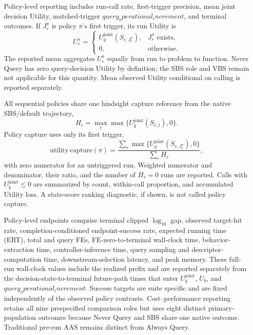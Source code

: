 Policy-level reporting includes run-call rate, first-trigger precision, mean
joint decision Utility, matched-trigger $query_operational_increment$, and terminal outcomes.  If
$J_r^\pi$ is policy $\pi$'s first trigger, its run Utility is
\begin{equation}
  U_r^\pi=
  \begin{cases}
    U_q^{\mathrm{joint}}(S_{r,J_r^\pi}), & J_r^\pi\text{ exists},\\
    0, & \text{otherwise}.
  \end{cases}
  \label{eq:policy-decision-utility}
\end{equation}
The reported mean aggregates $U_r^\pi$ equally from run to problem to function.
Never Query has zero query-decision Utility by definition; the SBS role and VBS
remain not applicable for this quantity.  Mean observed Utility conditional on
calling is reported separately.

All sequential policies share one hindsight capture reference from the native
SBS/default trajectory,
\begin{equation}
  H_r=\max_t\max\{U_q^{\mathrm{joint}}(S_{r,t}),0\}.
\end{equation}
Policy capture uses only its first trigger,
\begin{equation}
  \mathrm{utility\ capture}(\pi)=
  \frac{\sum_r\max\{U_q^{\mathrm{joint}}(S_{r,J_r^\pi}),0\}}
       {\sum_r H_r},
  \label{eq:utility-capture}
\end{equation}
with zero numerator for an untriggered run.  Weighted numerator and denominator,
their ratio, and the number of $H_r=0$ runs are reported.  Calls with
$U_q^{\mathrm{joint}}\le0$ are summarized by count, within-call proportion, and
accumulated Utility loss.  A state-score ranking diagnostic, if shown, is not
called policy capture.

Policy-level endpoints comprise terminal clipped $\log_{10}$ gap,
observed target-hit rate, completion-conditioned endpoint-success rate,
expected running time (ERT), total and query FEs,
FE-zero-to-terminal wall-clock time, behavior-extraction time,
controller-inference time, query
sampling and descriptor-computation time, downstream-selection latency, and
peak memory.  These full-run wall-clock values include the realized prefix and
are reported separately from the decision-state-to-terminal future-path times
that enter $U_q^{\mathrm{joint}}$, $U_b$, and $query_operational_increment$.  Success targets are suite specific and are fixed independently
of the observed policy contrasts.  Cost--performance reporting retains all
nine prespecified comparison roles but uses eight distinct primary-population
outcomes because Never Query and SBS share one native outcome.  Traditional
pre-run AAS remains distinct from Always Query.


